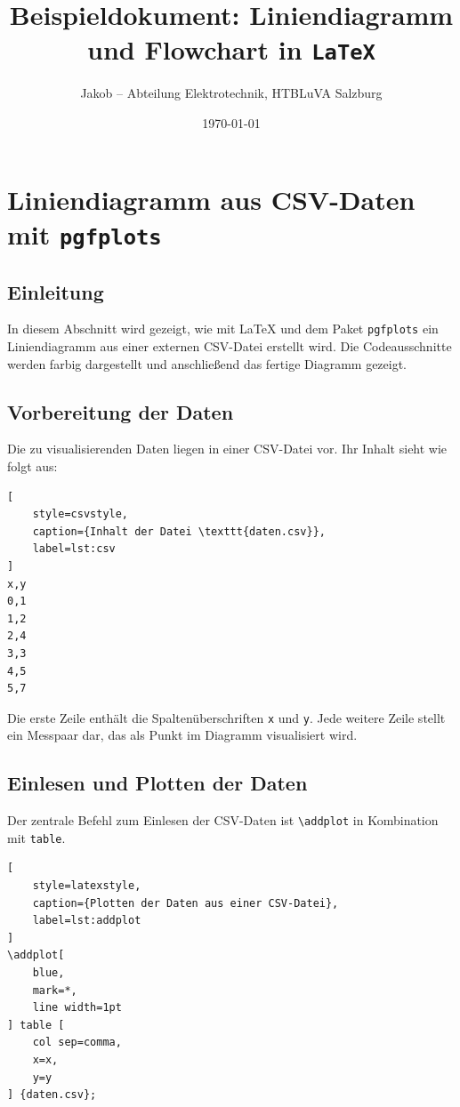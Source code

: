 \documentclass{article}
\title{Beispieldokument: Liniendiagramm und Flowchart in \texttt{LaTeX}}
\author{Jakob – Abteilung Elektrotechnik, HTBLuVA Salzburg}
\date{\today}
\begin{document}
\maketitle

\section{Liniendiagramm aus CSV-Daten mit \texttt{pgfplots}}

\subsection{Einleitung}
In diesem Abschnitt wird gezeigt, wie mit \LaTeX{} und dem Paket \texttt{pgfplots}
ein Liniendiagramm aus einer externen CSV-Datei erstellt wird.  
Die Codeausschnitte werden farbig dargestellt und anschließend das fertige Diagramm gezeigt.

\subsection{Vorbereitung der Daten}
Die zu visualisierenden Daten liegen in einer CSV-Datei vor.  
Ihr Inhalt sieht wie folgt aus:

\begin{lstlisting}[
    style=csvstyle,
    caption={Inhalt der Datei \texttt{daten.csv}},
    label=lst:csv
]
x,y
0,1
1,2
2,4
3,3
4,5
5,7
\end{lstlisting}

\noindent
Die erste Zeile enthält die Spaltenüberschriften \texttt{x} und \texttt{y}.  
Jede weitere Zeile stellt ein Messpaar dar, das als Punkt im Diagramm visualisiert wird.

\subsection{Einlesen und Plotten der Daten}
Der zentrale Befehl zum Einlesen der CSV-Daten ist \texttt{\textbackslash addplot} in Kombination mit \texttt{table}.

\begin{lstlisting}[
    style=latexstyle,
    caption={Plotten der Daten aus einer CSV-Datei},
    label=lst:addplot
]
\addplot[
    blue,
    mark=*,
    line width=1pt
] table [
    col sep=comma,
    x=x,
    y=y
] {daten.csv};
\end{lstlisting}
\end{document}
